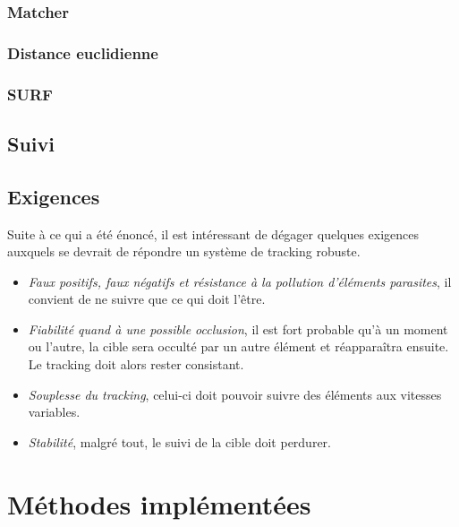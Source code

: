 \documentclass[a4paper,12pt]{report}
\begin{document}
\subsection{Matcher}
\subsection{Distance euclidienne}
\subsection{SURF}

\section{Suivi}


\section{Exigences}
Suite à ce qui a été énoncé, il est intéressant de dégager quelques exigences auxquels se devrait de répondre un système de tracking robuste. 
\begin{itemize}
\item \textit{Faux positifs, faux négatifs et résistance à la pollution d'éléments parasites}, il convient de ne suivre que ce qui doit l'être.
\item \textit{Fiabilité quand à une possible occlusion}, il est fort probable qu'à un moment ou l'autre, la cible sera occulté par un autre élément et réapparaîtra ensuite. Le tracking doit alors rester consistant.
\item \textit{Souplesse du tracking}, celui-ci doit pouvoir suivre des éléments aux vitesses variables.
\item \textit{Stabilité}, malgré tout, le suivi de la cible doit perdurer.
\end{itemize}


\chapter{Méthodes implémentées}

\end{document}
